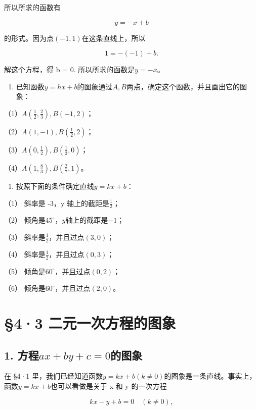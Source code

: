 所以所求的函数有

\[
y = - x + b
\]

的形式。因为点\((-1,1)\)在这条直线上，所以

\[
1 = - (- 1) + b.
\]

解这个方程，得 b = 0. 所以所求的函数是\(y = -x\)。

\begin{enumerate}
\item
  已知函数\(y = hx + b\)的图象通过\(A, B\)两点，确定这个函数，并且画出它的图象：
\end{enumerate}

（1）\(A\left(\frac{1}{2}, \frac{2}{3}\right), B(-1, 2)\)；

（2）\(A(1, -1), B\left(\frac{1}{2}, 2\right)\)；

（3）\(A\left(0, \frac{1}{2}\right), B\left(\frac{1}{3}, 0\right)\)；

（4）\(A\left(1, \frac{8}{3}\right), B\left(\frac{2}{7}, 1\right)\)。

\begin{enumerate}[start=2]
\item
  按照下面的条件确定直线\(y = kx + b\)：
\end{enumerate}

（1） 斜率是 -3，y 轴上的截距是\(\frac{1}{2}\)；

（2） 倾角是\(45^{\circ}\)，\(y\)轴上的截距是\(-1\)；

（3） 斜率是\(\frac{1}{2}\)，并且过点\((3, 0)\)；

（4） 斜率是\(\frac{1}{2}\)，并且过点\((0, 3)\)；

（5） 倾角是\(60^{\circ}\)，并且过点\((0, 2)\)；

（6） 倾角是\(60^{\circ}\)，并且过点\((2,0)\)。

\section{§4·3 二元一次方程的图象}

\subsection{\texorpdfstring{1. 方程\(ax + by + c = 0\)的图象}{1. 方程ax + by + c = 0的图象}}

在 §4·1
里，我们已经知道函数\(y = kx + b (k \neq 0)\)的图象是一条直线。事实上，函数\(y = kx + b\)也可以看做是关于
x 和 y 的一次方程

\[
k x - y + b = 0 \quad (k \neq 0),
\]

